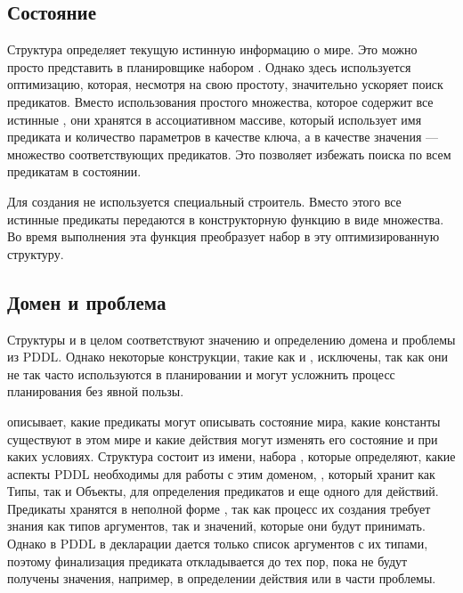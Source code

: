 \subsection{Состояние}

Структура  определяет текущую истинную информацию о мире.
Это можно просто представить в планировщике набором .
Однако здесь используется оптимизацию,
которая, несмотря на свою простоту, значительно ускоряет поиск предикатов.
Вместо использования простого множества, которое содержит все истинные ,
они хранятся в ассоциативном массиве,
который использует имя предиката и количество параметров в качестве ключа,
а в качестве значения --- множество соответствующих предикатов.
Это позволяет избежать поиска по всем предикатам в состоянии.

Для создания  не используется специальный строитель.
Вместо этого все истинные предикаты передаются в конструкторную функцию в виде множества.
Во время выполнения эта функция преобразует набор в эту оптимизированную структуру.

\subsection{Домен и проблема}

Структуры  и  в целом соответствуют
значению и определению домена и проблемы из PDDL.
Однако некоторые конструкции, такие как  и ,
исключены, так как они не так часто используются в планировании
и могут усложнить процесс планирования без явной пользы.

 описывает, какие предикаты могут описывать состояние мира,
какие константы существуют в этом мире
и какие действия могут изменять его состояние и при каких условиях.
Структура  состоит из имени, набора ,
которые определяют, какие аспекты PDDL необходимы для работы с этим доменом\footnotemark{},
, который хранит как Типы, так и Объекты,
 для определения предикатов и еще одного  для действий.
Предикаты хранятся в неполной форме ,
так как процесс их создания требует знания как типов аргументов,
так и значений, которые они будут принимать.
Однако в PDDL в декларации  дается только список аргументов с их типами,
поэтому финализация предиката откладывается до тех пор,
пока не будут получены значения, например, в определении действия или в части  проблемы.

